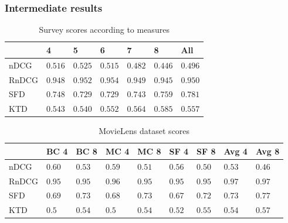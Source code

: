 \begin{frame}
\frametitle{Intermediate results}
\begin{table}[H]
	\centering
	\begin{tabular}{|l|llllll|} \hline
		& 4 & 5 & 6 & 7 & 8 & All \\ \hline
		nDCG	& $0.516$	& $0.525$	& $0.515$	& $0.482$ & $0.446$ & $0.496$ \\
		RnDCG	& $0.948$	& $0.952$	& $0.954$	& $0.949$ & $0.945$ & $0.950$ \\
		SFD	& $0.748$	& $0.729$	& $0.729$	& $0.743$ & $0.759$ & $0.781$ \\
		KTD	& $0.543$	& $0.540$	& $0.552$	& $0.564$ & $0.585$ & $0.557$ \\ \hline
	\end{tabular}
	\caption{Survey scores according to measures}
\end{table}

\begin{table}[H]
	\centering
	\begin{tabular}{|l|llllllll|} \hline
		& BC 4 & BC 8 & MC 4 & MC 8 & SF 4 & SF 8 & Avg 4 & Avg 8 \\ \hline
		nDCG	& $0.60$	& $0.53$	& $0.59$	& $0.51$ & $0.56$ & $0.50$ & $0.53$ & $0.46$ \\
		RnDCG	& $0.95$	& $0.95$	& $0.96$	& $0.95$ & $0.95$ & $0.95$ & $0.97$ & $0.97$ \\
		SFD	& $0.69$	& $0.73$	& $0.68$	& $0.73$ & $0.67$ & $0.72$ & $0.73$ & $0.77$ \\
		KTD	& $0.5$	& $0.54$	& $0.5$	& $0.54$ & $0.52$ & $0.55$ & $0.54$ & $0.57$\\ \hline
	\end{tabular}
	\caption{MovieLens dataset scores}
\end{table}
\end{frame}

